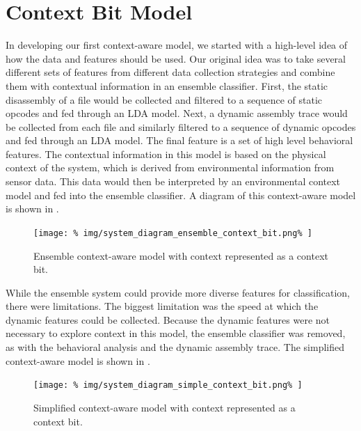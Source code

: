 \documentclass[../stegner_thesis.tex]{subfiles}
\begin{document}
\section{Context Bit Model}%
\label{sec:mthd_context_bit}

\par In developing our first context-aware model, we started with a high-level
idea of how the data and features should be used.
Our original idea was to take several different sets of features from different
data collection strategies and combine them with contextual information in an
ensemble classifier.
First, the static disassembly of a file would be collected and filtered to a
sequence of static opcodes and fed through an LDA model.
Next, a dynamic assembly trace would be collected from each file and similarly
filtered to a sequence of dynamic opcodes and fed through an LDA model.
The final feature is a set of high level behavioral features.
The contextual information in this model is based on the physical context
of the system, which is derived from environmental information from sensor
data.
This data would then be interpreted by an environmental context model and fed
into the ensemble classifier.
A diagram of this context-aware model is shown in
.

\begin{figure}[htb]
	\centering
	\texttt{[image: \%
		img/system\_diagram\_ensemble\_context\_bit.png\%
	]}
	\caption[Ensemble context bit model]{%
		Ensemble context-aware model with context represented as a context bit.
	}%
	\label{fig:ensemble_context_bit}
\end{figure}

\par While the ensemble system could provide more diverse features for
classification, there were limitations.
The biggest limitation was the speed at which the dynamic features could be
collected.
Because the dynamic features were not necessary to explore context in this
model, the ensemble classifier was removed, as with the behavioral analysis and
the dynamic assembly trace.
The simplified context-aware model is shown in .

\begin{figure}[htb]
	\centering
	\texttt{[image: \%
		img/system\_diagram\_simple\_context\_bit.png\%
	]}
	\caption[Simplified context bit model]{%
		Simplified context-aware model with context represented as a context bit.
	}%
	\label{fig:simple_context_bit}
\end{figure}
\end{document}
